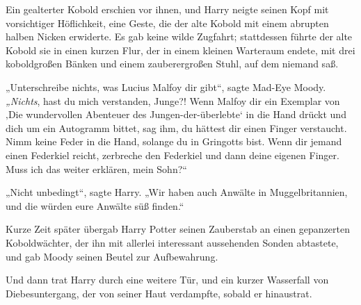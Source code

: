 Ein gealterter Kobold erschien vor ihnen, und Harry neigte seinen Kopf mit vorsichtiger Höflichkeit, eine Geste, die der alte Kobold mit einem abrupten halben Nicken erwiderte. Es gab keine wilde Zugfahrt; stattdessen führte der alte Kobold sie in einen kurzen Flur, der in einem kleinen Warteraum endete, mit drei koboldgroßen Bänken und einem zauberergroßen Stuhl, auf dem niemand saß.

„Unterschreibe nichts, was Lucius Malfoy dir gibt“, sagte Mad-Eye Moody. \emph{„Nichts}, hast du mich verstanden, Junge?! Wenn Malfoy dir ein Exemplar von ‚Die wundervollen Abenteuer des Jungen-der-überlebte‘ in die Hand drückt und dich um ein Autogramm bittet, sag ihm, du hättest dir einen Finger verstaucht. Nimm keine Feder in die Hand, solange du in Gringotts bist. Wenn dir jemand einen Federkiel reicht, zerbreche den Federkiel und dann deine eigenen Finger. Muss ich das weiter erklären, mein Sohn?“

„Nicht unbedingt“, sagte Harry. „Wir haben auch Anwälte in Muggelbritannien, und die würden eure Anwälte süß finden.“

Kurze Zeit später übergab Harry Potter seinen Zauberstab an einen gepanzerten Koboldwächter, der ihn mit allerlei interessant aussehenden Sonden abtastete, und gab Moody seinen Beutel zur Aufbewahrung.

Und dann trat Harry durch eine weitere Tür, und ein kurzer Wasserfall von Diebesuntergang, der von seiner Haut verdampfte, sobald er hinaustrat.

